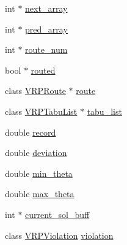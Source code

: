 \begin{DoxyCompactItemize}
\item 
int $\ast$ \hyperlink{class_v_r_p_acd2b81d8d25db522d089a33b212107ce}{next\_\-array}
\item 
int $\ast$ \hyperlink{class_v_r_p_a171c6f136ff0334141eba4f8df239f3a}{pred\_\-array}
\item 
int $\ast$ \hyperlink{class_v_r_p_aaf42240b29e2ddf0c79b3da8cd6a3087}{route\_\-num}
\item 
bool $\ast$ \hyperlink{class_v_r_p_a49559f4098eea0527da72878fb5d5404}{routed}
\item 
class \hyperlink{class_v_r_p_route}{VRPRoute} $\ast$ \hyperlink{class_v_r_p_a031f5b20e9fcbcb5f79839444ce0bbfc}{route}
\item 
class \hyperlink{class_v_r_p_tabu_list}{VRPTabuList} $\ast$ \hyperlink{class_v_r_p_ae2febf169fbb970db5d3e4b1afdfdf2b}{tabu\_\-list}
\item 
double \hyperlink{class_v_r_p_a0561674f364aba302b1cc4d0f76f6837}{record}
\item 
double \hyperlink{class_v_r_p_a1e39d7493e674f4a22f22f21e5d0bd87}{deviation}
\item 
double \hyperlink{class_v_r_p_a3690e58ce5c9ad561b338359181203f3}{min\_\-theta}
\item 
double \hyperlink{class_v_r_p_a99bfad6795281816b4036ad42a900b3d}{max\_\-theta}
\item 
int $\ast$ \hyperlink{class_v_r_p_a8117433ec924a862c615d1a4c5f89b4a}{current\_\-sol\_\-buff}
\item 
class \hyperlink{class_v_r_p_violation}{VRPViolation} \hyperlink{class_v_r_p_a3bd307863feb6d22fb036771d76d0f48}{violation}
\end{DoxyCompactItemize}

